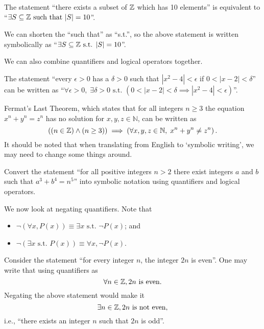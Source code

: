 \begin{example}
    The statement ``there exists a subset of $\mathbb{Z}$ which has 10 elements'' is equivalent to ``$\exists S \subseteq \mathbb{Z} \text{ such that } |S| = 10$''.
\end{example}
\begin{remark}
    We can shorten the ``such that'' as ``s.t.'', so the above statement is written symbolically as ``$\exists S \subseteq \mathbb{Z} \text{ s.t. } |S| = 10$''.
\end{remark}

We can also combine quantifiers and logical operators together.
\begin{example}
    The statement ``every $\epsilon > 0$ has a $\delta > 0$ such that $|x^2 - 4| < \epsilon$ if $0 < |x - 2| < \delta$'' can be written as ``$\forall \epsilon > 0,\;\exists \delta > 0 \text{ s.t. } (0 < |x - 2| < \delta \implies |x^2 - 4| < \epsilon)$''.
\end{example}

\begin{example}
    Fermat's Last Theorem, which states that for all integers $n\geq 3$ the equation $x^n + y^n = z^n$ has no solution for $x, y, z \in \mathbb{N}$, can be written as
    \[
        \left((n \in \mathbb{Z}) \land (n \geq 3)\right) \implies \left(\forall x, y, z \in \mathbb{N},\; x^n + y^n \neq z^n\right).
    \]
    It should be noted that when translating from English to `symbolic writing', we may need to change some things around.
\end{example}

\begin{exercise}
    Convert the statement ``for all positive integers $n > 2$ there exist integers $a$ and $b$ such that $a^3 + b^4 = n^5$'' into symbolic notation using quantifiers and logical operators.
\end{exercise}

\newpage

We now look at negating quantifiers. Note that
\begin{itemize}
    \item $\lnot(\forall x, P(x)) \equiv \exists x \text{ s.t. } \lnot P(x)$; and
    \item $\lnot(\exists x \text{ s.t. } P(x)) \equiv \forall x, \lnot P(x)$.
\end{itemize}

\begin{example}
    Consider the statement ``for every integer $n$, the integer $2n$ is even''. One may write that using quantifiers as
    \[
        \forall n \in\mathbb{Z}, 2n \text{ is even}.
    \]
    Negating the above statement would make it
    \[
        \exists n \in \mathbb{Z}, 2n \text{ is not even},
    \]
    i.e., ``there exists an integer $n$ such that $2n$ is odd''.
\end{example}


